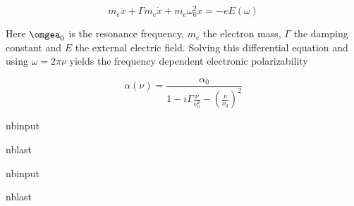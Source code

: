 \documentclass[letterpaper,10pt,english]{sphinxmanual}
\begin{document}
\sphinxAtStartPar
\begin{equation}
m_{e}\ddot{x}+\Gamma m_e \dot{x}+m_e \omega_0^2  x=-e E(\omega)
\end{equation}

\sphinxAtStartPar
Here \(\omgea_0\) is the resonance frequency, \(m_e\) the electron mass, \(\Gamma\) the damping constant and \(E\) the external electric field. Solving this differential equation and using \(\omega=2\pi \nu\) yields the frequency dependent electronic polarizability

\sphinxAtStartPar
\begin{equation}
\alpha(\nu)=\frac{\alpha_0}{1-i\Gamma \frac{\nu}{\nu_0^2}-\left ( \frac{\nu}{\nu_0}\right)^2}
\end{equation}

\begin{sphinxuseclass}{nbinput}
\begin{sphinxuseclass}{nblast}
{
\begin{sphinxVerbatim}[commandchars=\\\{\}]
\llap{\color{nbsphinxin}[151]:\,\hspace{\fboxrule}\hspace{\fboxsep}} 
\end{sphinxVerbatim}
}

\end{sphinxuseclass}
\end{sphinxuseclass}
\begin{sphinxuseclass}{nbinput}
\begin{sphinxuseclass}{nblast}
{
\begin{sphinxVerbatim}[commandchars=\\\{\}]
\llap{\color{nbsphinxin}[152]:\,\hspace{\fboxrule}\hspace{\fboxsep}}
\end{sphinxVerbatim}
}

\end{sphinxuseclass}
\end{sphinxuseclass}
\end{document}
